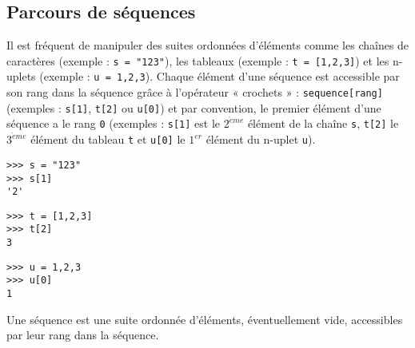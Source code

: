 \subsection{Parcours de séquences}
Il est fréquent de manipuler des suites ordonnées d'éléments comme 
les chaînes de caractères (exemple : {\tt s = "123"}), les tableaux
(exemple : {\tt t = [1,2,3]}) et les n-uplets (exemple : {\tt u = 1,2,3}).
Chaque élément d'une séquence est accessible par son rang dans la séquence 
grâce à l'opérateur « crochets » : {\tt sequence[rang]} (exemples : {\tt s[1]}, {\tt t[2]} ou {\tt u[0]}) et par convention, 
le premier élément d'une séquence a le rang {\tt 0} (exemples : {\tt s[1]} est le $2^{\grave eme}$
élément de la chaîne {\tt s}, {\tt t[2]} le $3^{\grave eme}$ élément du tableau {\tt t}
et {\tt u[0]} le $1^{er}$ élément du n-uplet {\tt u}).

\begin{minipage}[t]{4cm}
\begin{Verbatim}
>>> s = "123"
>>> s[1]
'2'
\end{Verbatim}
\end{minipage}
\hfill
\begin{minipage}[t]{4cm}
\begin{Verbatim}
>>> t = [1,2,3]
>>> t[2]
3
\end{Verbatim}
\end{minipage}
\hfill
\begin{minipage}[t]{4cm}
\begin{Verbatim}
>>> u = 1,2,3
>>> u[0]
1
\end{Verbatim}
\end{minipage}

\begin{definition}[séquence]
Une séquence est une suite ordonnée d'éléments, éventuellement vide, 
accessibles par leur rang dans la séquence.
\end{definition}

